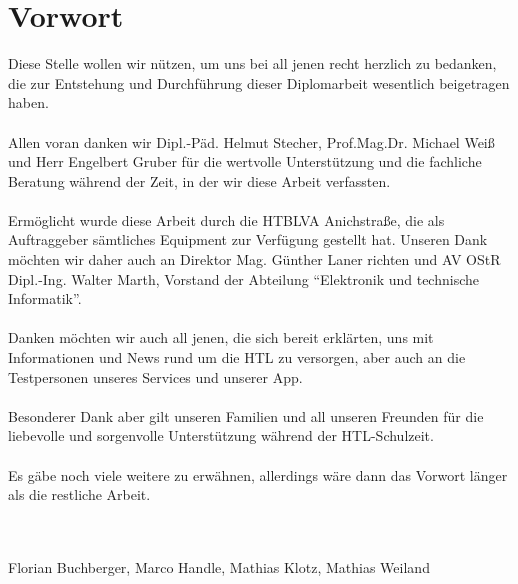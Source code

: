 \chapter{Vorwort}


Diese Stelle wollen wir nützen, um uns bei all jenen recht herzlich zu bedanken, die zur Entstehung und Durchführung dieser Diplomarbeit wesentlich beigetragen haben.\\
\\
Allen voran danken wir Dipl.-Päd. Helmut Stecher, Prof.Mag.Dr. Michael Weiß und Herr Engelbert Gruber für die wertvolle Unterstützung und die fachliche Beratung während der Zeit, in der wir diese Arbeit verfassten.\\
\\
Ermöglicht wurde diese Arbeit durch die HTBLVA Anichstraße, die als Auftraggeber sämtliches Equipment zur Verfügung gestellt hat. Unseren Dank möchten wir daher auch an Direktor Mag. Günther Laner richten und AV OStR Dipl.-Ing. Walter Marth, Vorstand der Abteilung \enquote{Elektronik und technische Informatik}.\\
\\
Danken möchten wir auch all jenen, die sich bereit erklärten, uns mit Informationen und News rund um die HTL zu versorgen, aber auch an die Testpersonen unseres Services und unserer App.\\
\\
Besonderer Dank aber gilt unseren Familien und all unseren Freunden für die liebevolle und sorgenvolle Unterstützung während der HTL-Schulzeit.\\
\\
Es gäbe noch viele weitere zu erwähnen, allerdings wäre dann das Vorwort länger als die restliche Arbeit.\\
\\
\\
\begin{flushright}
Florian Buchberger, Marco Handle, Mathias Klotz, Mathias Weiland
\end{flushright}
